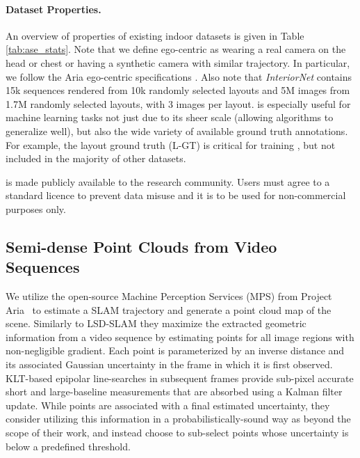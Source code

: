 
%
\paragraph{Dataset Properties.} An overview of properties of existing indoor datasets is given in Table \ref{tab:ase_stats}.
Note that
we define ego-centric as wearing a real camera on the head or chest
or having a synthetic camera with similar trajectory.
In particular, 
we follow the Aria ego-centric specifications \cite{aria_white_paper}.
Also note that
\emph{InteriorNet} contains 15k sequences 
rendered from 10k randomly selected layouts and
5M images from 1.7M randomly selected layouts,
with 3 images per layout.
%
\DatasetName{} is especially useful for machine learning tasks not just due to its sheer scale (allowing algorithms to generalize well), but also the wide variety of available ground truth annotations.
For example, the layout ground truth (L-GT) is critical for training \METHOD,
but not included in the majority of other datasets.

\DatasetName{} is made publicly available to the research community.
Users must agree to a standard licence to prevent data misuse
and it is to be used for non-commercial purposes only.


\subsection{Semi-dense Point Clouds from Video Sequences}

We utilize the open-source Machine Perception Services (MPS) from Project Aria~\cite{AriaMPS2023} to estimate a SLAM trajectory and generate a point cloud map of the scene. Similarly to LSD-SLAM \cite{engel14eccv} they maximize the extracted geometric information from a video sequence by estimating points for all image regions with non-negligible gradient. Each point is parameterized by an inverse distance and its associated Gaussian uncertainty in the frame in which it is first observed. KLT-based \cite{tomasi1991detection} epipolar line-searches in subsequent frames provide sub-pixel accurate short and large-baseline measurements that are absorbed using a Kalman filter update. While points are associated with a final estimated uncertainty, they consider utilizing this information in a probabilistically-sound way as beyond the scope of their work, and instead choose to sub-select points whose uncertainty is below a predefined threshold.

% 

